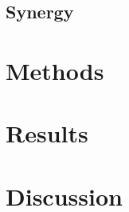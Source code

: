 \documentclass{article}
\begin{document}


\subsection{Synergy}



\section{Methods}



\section{Results}



\section{Discussion}





\end{document}
